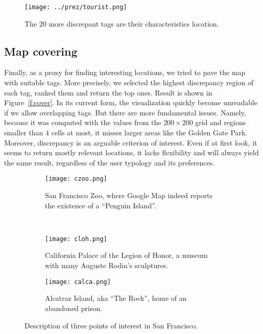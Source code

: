 \begin{figure}[b]
\centering
\vspace{-2.8\baselineskip}
\texttt{[image: ../prez/tourist.png]}
\caption{The $20$ more discrepant tags are their characteristics
location.\label{f:cover}}
\end{figure}

\subsection{Map covering}

Finally, as a proxy for finding interesting locations, we tried to pave the
map with suitable tags. More precisely, we selected the highest discrepancy
region of each tag, ranked them and return the top ones. Result is shown in
Figure~\vref{f:cover}. In its current form, the visualization quickly become
unreadable if we allow overlapping tags. But there are more fundamental
issues. Namely, because it was computed with the values from the $200\times
200$ grid and regions smaller than $4$ cells at most, it misses larger areas
like the Golden Gate Park.  Moreover, discrepancy is an arguable criterion of
interest. Even if at first look, it seems to return mostly relevant locations,
it lacks flexibility and will always yield the same result, regardless of the
user typology and its preferences.

\begin{figure}
        \centering
        \begin{subfigure}[b]{0.5\textwidth}
                \texttt{[image: czoo.png]}
                \caption{San Francisco Zoo, where Google Map indeed reports
the existence of a \enquote{Penguin Island}.}
        \end{subfigure}~
        \begin{subfigure}[b]{0.5\textwidth}
                \texttt{[image: cloh.png]}
                \caption{California Palace of the Legion of Honor, a museum
					with many Auguste Rodin's sculptures.}
        \end{subfigure}

        \begin{subfigure}[b]{0.5\textwidth}
                \texttt{[image: calca.png]}
                \caption{Alcatraz Island, aka \enquote{The Rock}, home of an
abandoned prison.\label{f:alca}}
        \end{subfigure}
		\caption{Description of three points of interest in San Francisco.\label{f:loc}}
\end{figure}

